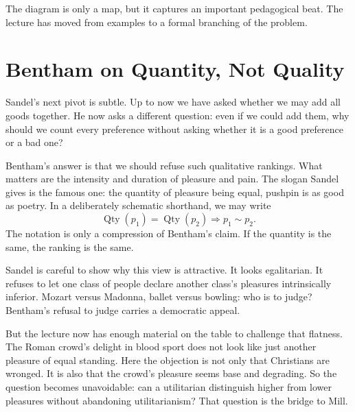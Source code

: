 \begin{figure}
\centering
{}
\end{figure}

The diagram is only a map, but it captures an important pedagogical beat. The lecture has moved from examples to a formal branching of the problem.

\section{Bentham on Quantity, Not Quality}

Sandel's next pivot is subtle. Up to now we have asked whether we may add all goods together. He now asks a different question: even if we could add them, why should we count every preference without asking whether it is a good preference or a bad one?

Bentham's answer is that we should refuse such qualitative rankings. What matters are the intensity and duration of pleasure and pain. The slogan Sandel gives is the famous one: the quantity of pleasure being equal, pushpin is as good as poetry. In a deliberately schematic shorthand, we may write
\begin{equation}
\operatorname{Qty}(p_1)=\operatorname{Qty}(p_2)\Longrightarrow p_1\sim p_2.
\end{equation}
The notation is only a compression of Bentham's claim. If the quantity is the same, the ranking is the same.

Sandel is careful to show why this view is attractive. It looks egalitarian. It refuses to let one class of people declare another class's pleasures intrinsically inferior. Mozart versus Madonna, ballet versus bowling: who is to judge? Bentham's refusal to judge carries a democratic appeal.

But the lecture now has enough material on the table to challenge that flatness. The Roman crowd's delight in blood sport does not look like just another pleasure of equal standing. Here the objection is not only that Christians are wronged. It is also that the crowd's pleasure seems base and degrading. So the question becomes unavoidable: can a utilitarian distinguish higher from lower pleasures without abandoning utilitarianism? That question is the bridge to Mill.

